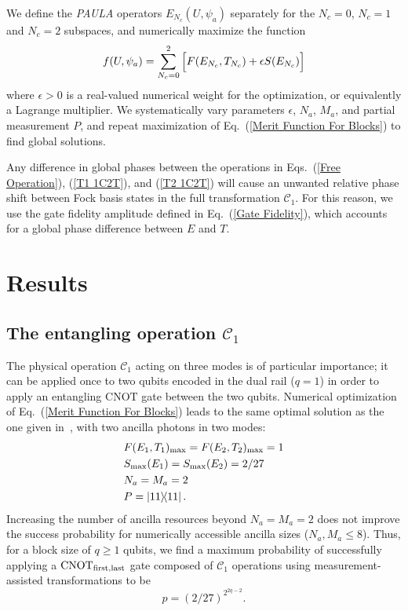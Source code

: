 \documentclass[aps,pra,twocolumn,superscriptaddress,floatfix,10pt]{revtex4}
\begin{document}
We define the \textit{PAULA} operators $E_{N_c}(U,\psi_a)$ separately for the $N_c=0$, $N_c=1$ and $N_c=2$ subspaces,
and numerically maximize the function
\begin{equation}
\label{Merit Function For Blocks}
\small f(U,\psi_a) = \sum_{N_c=0}^{2} \Big[ F(E_{N_c},T_{N_c}) + \epsilon S(E_{N_c}) \Big]
\end{equation}
where $\epsilon > 0$ is a real-valued numerical weight for the optimization, or equivalently a Lagrange multiplier. We systematically vary parameters $\epsilon$, $N_a$, $M_a$, and partial measurement $P$, and repeat maximization of Eq.~(\ref{Merit Function For Blocks}) to find global solutions.

Any difference in global phases between the operations in Eqs.~(\ref{Free Operation}), (\ref{T1 1C2T}), and (\ref{T2 1C2T}) will cause an unwanted relative phase shift between Fock basis states in the full transformation $\mathcal{C}_1$. For this reason, we use the gate fidelity amplitude defined in Eq.~(\ref{Gate Fidelity}), which accounts for a global phase difference between $E$ and $T$. 
\section{Results}
\label{Section on Results}
\subsection{The entangling operation $\mathcal{C}_1$}
The physical operation $\mathcal{C}_1$ acting on three modes is of particular importance; it can be applied once to two qubits encoded in the dual rail ($q=1$) in order to apply an entangling $\mbox{CNOT}$ gate between the two qubits. Numerical optimization of Eq.~(\ref{Merit Function For Blocks}) leads to the same optimal solution as the one given in~\cite{Uskov}, with two ancilla photons in two modes:
\begin{eqnarray}
& F(E_1,T_1)_{\rm max} = F(E_2,T_2)_{\rm max} = 1 \nonumber \\
& S_{\rm max}(E_1) = S_{\rm max}(E_2) = 2/27 \\
& N_a=M_a=2 \nonumber \\
& P = \outerproduct{11}{11} \nonumber	.
\end{eqnarray}
Increasing the number of ancilla resources beyond $N_a=M_a=2$ does not improve the success probability for numerically accessible ancilla sizes ($N_a,M_a \le 8$). Thus, for a block size of $q \ge 1$ qubits, we find a maximum probability of successfully applying a $\mbox{CNOT}_{\rm first,last}$ gate composed of $\mathcal{C}_1$ operations using measurement-assisted transformations to be
\begin{equation}
\label{1C2T Result}
p = (2/27)^{2^{2q-2}}.
\end{equation}
\end{document}
